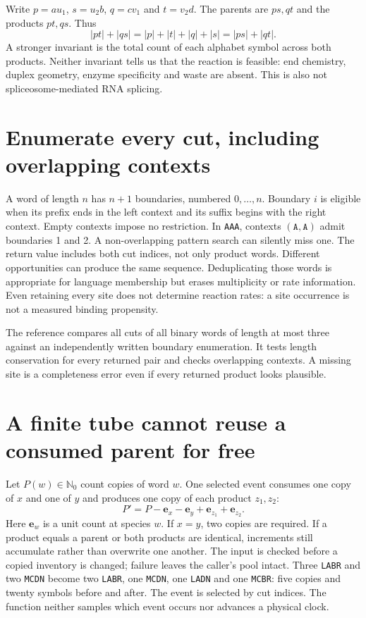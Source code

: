 Write $p=au_1$, $s=u_2b$, $q=cv_1$ and $t=v_2d$. The parents are $ps,qt$
and the products $pt,qs$. Thus
\begin{equation}
 |pt|+|qs|=|p|+|t|+|q|+|s|=|ps|+|qt|.
 \label{eq:length}
\end{equation}
A stronger invariant is the total count of each alphabet symbol across
both products. Neither invariant tells us that the reaction is feasible:
end chemistry, duplex geometry, enzyme specificity and waste are absent.
This is also not spliceosome-mediated RNA splicing.

\section{Enumerate every cut, including overlapping contexts}
A word of length $n$ has $n+1$ boundaries, numbered $0,\ldots,n$.
Boundary $i$ is eligible when its prefix ends in the left context and its
suffix begins with the right context. Empty contexts impose no restriction.
In \texttt{AAA}, contexts $(\texttt{A},\texttt{A})$ admit boundaries 1 and 2.
A non-overlapping pattern search can silently miss one.
The return value includes both cut indices, not only product words.
Different opportunities can produce the same sequence. Deduplicating
those words is appropriate for language membership but erases multiplicity
or rate information. Even retaining every site does not determine reaction rates:
a site occurrence is not a measured binding propensity.

The reference compares all cuts of all binary words of length at most three
against an independently written boundary enumeration. It tests length
conservation for every returned pair and checks overlapping contexts.
A missing site is a completeness error even if every returned product looks plausible.

\section{A finite tube cannot reuse a consumed parent for free}
Let $P(w)\in\mathbb N_0$ count copies of word $w$. One selected event consumes
one copy of $x$ and one of $y$ and produces one copy of each product $z_1,z_2$:
\begin{equation}
 P'=P-\mathbf e_x-\mathbf e_y+\mathbf e_{z_1}+\mathbf e_{z_2}.
 \label{eq:inventory}
\end{equation}
Here $\mathbf e_w$ is a unit count at species $w$. If $x=y$, two copies are
required. If a product equals a parent or both products are identical,
increments still accumulate rather than overwrite one another.
The input is checked before a copied inventory is changed; failure leaves the
caller's pool intact. Three \texttt{LABR} and two \texttt{MCDN} become two
\texttt{LABR}, one \texttt{MCDN}, one \texttt{LADN} and one \texttt{MCBR}:
five copies and twenty symbols before and after.
The event is selected by cut indices. The function neither samples which
event occurs nor advances a physical clock.

